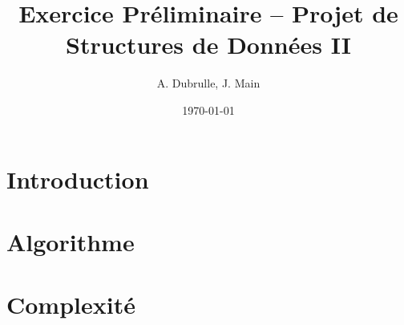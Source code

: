 \documentclass[a4paper, 12pt]{article}
\title{Exercice Préliminaire -- Projet de Structures de Données II}
\author{A. Dubrulle, J. Main}
\date{\today}
\begin{document}
\maketitle

\section{Introduction}

\section{Algorithme}

\section{Complexité}
\end{document}
